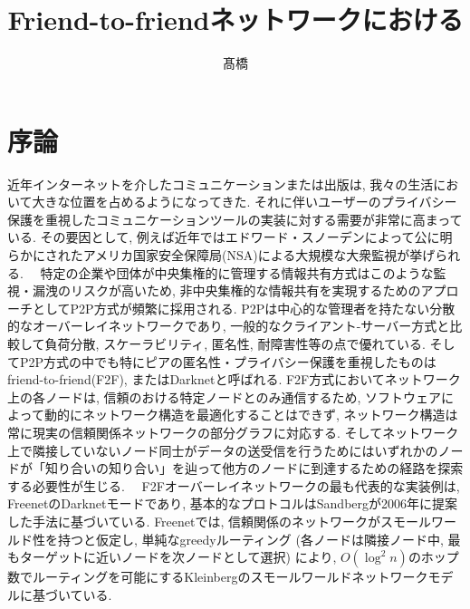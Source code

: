 \documentclass[dvipdfmx]{ampbt}
\title{Friend-to-friendネットワークにおける} %
      {効率的な非中央集権的ルーティング}                         %
      {}                                         %
\author{髙橋}{彰}             %
\begin{document}
\ifoutputbody
\makeinsidecover                %
\makeabstract                   %
\maketoc                        %
\setcounter{page}{1}            %
\section{序論}
近年インターネットを介したコミュニケーションまたは出版は, 我々の生活において大きな位置を占めるようになってきた. それに伴いユーザーのプライバシー保護を重視したコミュニケーションツールの実装に対する需要が非常に高まっている. その要因として, 例えば近年ではエドワード・スノーデンによって公に明らかにされたアメリカ国家安全保障局(NSA)による大規模な大衆監視が挙げられる. \newline
\ \ 特定の企業や団体が中央集権的に管理する情報共有方式はこのような監視・漏洩のリスクが高いため, 非中央集権的な情報共有を実現するためのアプローチとしてP2P方式が頻繁に採用される. P2Pは中心的な管理者を持たない分散的なオーバーレイネットワークであり, 一般的なクライアント-サーバー方式と比較して負荷分散, スケーラビリティ, 匿名性, 耐障害性等の点で優れている\cite{lua2005survey}. そしてP2P方式の中でも特にピアの匿名性・プライバシー保護を重視したものはfriend-to-friend(F2F)\cite{bricklin2000friend}, またはDarknet\cite{clarke2010private}と呼ばれる. F2F方式においてネットワーク上の各ノードは, 信頼のおける特定ノードとのみ通信するため, ソフトウェアによって動的にネットワーク構造を最適化することはできず, ネットワーク構造は常に現実の信頼関係ネットワークの部分グラフに対応する. そしてネットワーク上で隣接していないノード同士がデータの送受信を行うためにはいずれかのノードが「知り合いの知り合い」を辿って他方のノードに到達するための経路を探索する必要性が生じる\cite{roos2016dealing}.\newline
\ \ F2Fオーバーレイネットワークの最も代表的な実装例は, Freenet\cite{clarke2001freenet}のDarknetモード\cite{clarke2010private}であり, 基本的なプロトコルはSandberg\cite{sandberg2006distributed}が2006年に提案した手法に基づいている. Freenetでは, 信頼関係のネットワークがスモールワールド性を持つと仮定し, 単純なgreedyルーティング (各ノードは隣接ノード中, 最もターゲットに近いノードを次ノードとして選択) により, $O(\log^2 n)$のホップ数でルーティングを可能にするKleinbergのスモールワールドネットワークモデル\cite{kleinberg2000small}に基づいている. \newline
\end{document}
